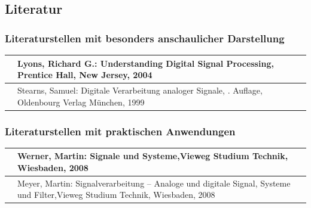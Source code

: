 \begin{table}[H]
{\begin{tabular}{| c | c |}
\parbox[c][1in][c]{3.3in}{} & 
\parbox[c][1in][c]{3.3in}{}\\ \hline

\end{tabular}%
}
\label{tab:threefive}
\end{table}

\clearpage

\subsection{Literatur}

\subsubsection{Literaturstellen mit besonders anschaulicher Darstellung}

\begin{tabular}{|p{0.7in}|p{5in}|} \hline 
[Lyon04] & Lyons, Richard G.: Understanding Digital Signal Processing, \newline Prentice Hall, New Jersey, 2004 \\ \hline 
[Stea99] & Stearns, Samuel: Digitale Verarbeitung analoger Signale, \newline 7. Auflage, Oldenbourg Verlag M\"{u}nchen, 1999 \\ \hline 
\end{tabular}


\subsubsection{Literaturstellen mit praktischen Anwendungen}

\begin{tabular}{|p{0.7in}|p{5.5in}|} \hline 
[Wern08] & Werner, Martin: Signale und Systeme,\newline Vieweg Studium Technik, Wiesbaden, 2008 \\ \hline 
[Meye08] & Meyer, Martin: Signalverarbeitung -- Analoge und digitale Signal, Systeme und Filter,\newline Vieweg Studium Technik, Wiesbaden, 2008 \\ \hline 
\end{tabular}


